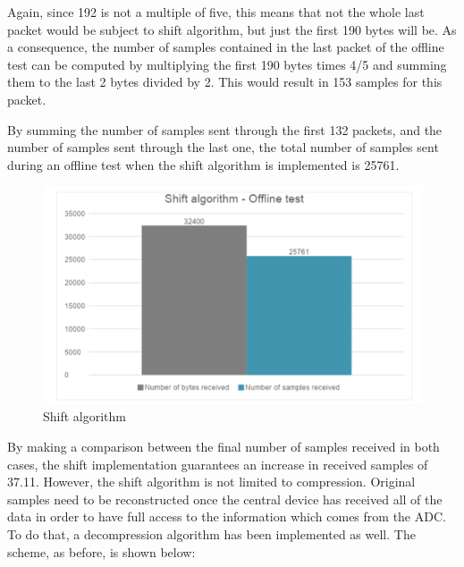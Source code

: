 \documentclass{Configuration_Files/PoliMi3i_thesis}
\begin{document}
Again, since 192 is not a multiple of five, this means that not the whole last packet would be subject to shift algorithm, but just the first 190 bytes will be. As a consequence, the number of samples contained in the last packet of the offline test can be computed by multiplying the first 190 bytes times 4/5 and summing them to the last 2 bytes divided by 2. This would result in 153 samples for this packet.

By summing the number of samples sent through the first 132 packets, and the number of samples sent through the last one, the total number of samples sent during an offline test when the shift algorithm is implemented is 25761.

\begin{figure}[H]
    \centering
    \includegraphics[scale=0.7]{Shift Algorithm/Screenshot 2024-07-22 at 22.31.45.png}
    \caption{Shift algorithm}
    \label{pairing_procedure_5}
\end{figure}

By making a comparison between the final number of samples received in both cases, the shift implementation guarantees an increase in received samples of 37.11. However, the shift algorithm is not limited to compression. Original samples need to be reconstructed once the central device has received all of the data in order to have full access to the information which comes from the ADC. To do that, a decompression algorithm has been implemented as well. The scheme, as before, is shown below:
\end{document}
